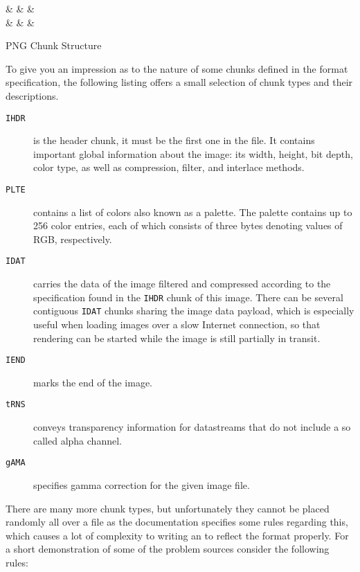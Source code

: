 \begin{listing}[H]
\centering
\begin{bytefield}[boxformatting={\centering\small}]{32}
 &
 &
 &
 \\
 &
 &
 &
\end{bytefield}
\caption{PNG Chunk Structure}
\label{lst:pngchunks}
\end{listing}

To give you an impression as to the nature of some chunks defined in the format specification, the following
listing offers a small selection of chunk types and their descriptions.
\begin{description}
	\item[\texttt{IHDR}] is the header chunk, it must be the first one in the \png file. It contains important
	global information about the image: its width, height, bit depth, color type, as well as compression, filter,
	and interlace methods.
	\item[\texttt{PLTE}] contains a list of colors also known as a palette. The palette contains up to 256 color
	entries, each of which consists of three bytes denoting values of RGB, respectively.
	\item[\texttt{IDAT}] carries the data of the image filtered and compressed according to the specification
	found in the \texttt{IHDR} chunk of this image. There can be several contiguous \texttt{IDAT} chunks sharing
	the image data payload, which is especially useful when loading images over a slow Internet connection, so
	that rendering can be started while the image is still partially in transit.
	\item[\texttt{IEND}] marks the end of the image.
	\item[\texttt{tRNS}] conveys transparency information for datastreams that do not include a so called alpha
	channel.
	\item[\texttt{gAMA}] specifies gamma correction for the given image file.
\end{description}

There are many more chunk types, but unfortunately they cannot be placed randomly all over a \png file as the
documentation specifies some rules regarding this, which causes a lot of complexity to writing an \xsd to
reflect the \png format properly. For a short demonstration of some of the problem sources consider the
following rules:

